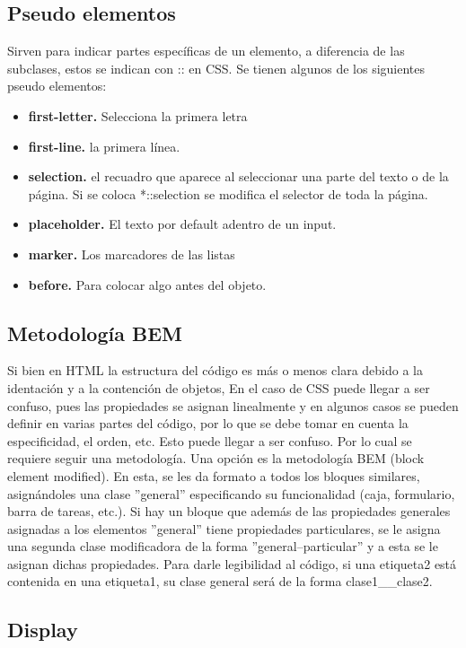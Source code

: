 \documentclass[10pt,oneside]{article}
\begin{document}
\begin{multicols}{2}
\subsection{Pseudo elementos}
    Sirven para indicar partes específicas de un elemento, a diferencia de las subclases, estos se indican con :: en CSS. Se tienen algunos de los siguientes pseudo elementos:
    \begin{itemize}
        \item \textbf{first-letter.} Selecciona la primera letra
        \item \textbf{first-line.}  la primera línea.
        \item \textbf{selection.} el recuadro que aparece al seleccionar una parte del texto o de la página. Si se coloca *::selection se modifica el selector de toda la página.
        \item \textbf{placeholder.} El texto por default adentro de un input.
        \item \textbf{marker.} Los marcadores de las listas
        \item \textbf{before.} Para colocar algo antes del objeto.
    \end{itemize}

\subsection{Metodología BEM}

    Si bien en HTML la estructura del código es más o menos clara debido a la identación y a la contención de objetos, En el caso de CSS puede llegar a ser confuso, pues  las propiedades  se asignan linealmente y en algunos casos se pueden definir en varias partes del código, por lo que se debe tomar en cuenta la especificidad, el orden, etc. Esto puede llegar a ser confuso. Por lo cual se requiere seguir una metodología.  Una opción es la metodología BEM (block element modified).  En esta, se les da formato a todos los bloques similares, asignándoles una clase ''general'' especificando su funcionalidad (caja, formulario, barra de tareas, etc.).  Si hay un bloque que además de las propiedades generales asignadas a los elementos ''general'' tiene propiedades particulares, se le asigna una segunda clase modificadora de la forma ''general--particular'' y a esta se le asignan dichas propiedades. Para darle legibilidad al código, si una etiqueta2 está contenida en una etiqueta1, su clase general será de la forma clase1\_\_clase2.

\subsection{Display}


\end{multicols}
\end{document}
